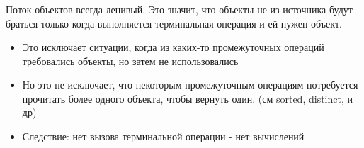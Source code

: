 \begin{frame}
\frametitle{\insertsection} 
\framesubtitle{\insertsubsection}
Поток объектов всегда ленивый. Это значит, что объекты не из источника будут браться только когда выполняется терминальная операция и ей нужен объект.
\begin{itemize}
	\item Это исключает ситуации, когда из каких-то промежуточных операций требовались объекты, но затем не использовались
	\item Но это не исключает, что некоторым промежуточным операциям потребуется прочитать более одного объекта, чтобы вернуть один. (см sorted, distinct, и др)
	\item Следствие: нет вызова терминальной операции - нет вычислений
\end{itemize}

\end{frame}